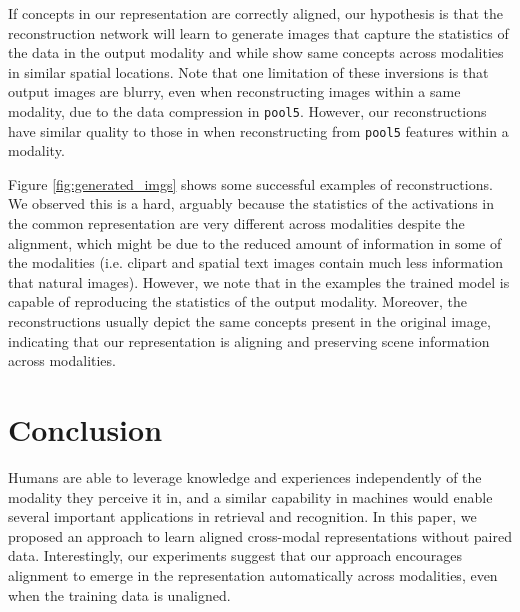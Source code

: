 \documentclass[10pt,journal,compsoc]{IEEEtran}
\begin{document}
    If concepts in our representation are correctly aligned, our hypothesis is that the reconstruction network will learn to generate images that capture the statistics of the data in the output modality and while show same concepts across modalities in similar spatial locations. Note that one limitation of these inversions is that output images are blurry, even when reconstructing images within a same modality, due to the data compression in \texttt{pool5}. However, our reconstructions have similar quality to those in \cite{dosovitskiy2015inverting} when reconstructing from \texttt{pool5} features within a modality.
	
    
    Figure \ref{fig:generated_imgs} shows some successful examples of reconstructions. We observed this is a hard, arguably because the statistics of the activations in the common representation are very different across modalities despite the alignment, which might be due to the reduced amount of information in some of the modalities (i.e. clipart and spatial text images contain much less information that natural images). However, we note that in the examples the trained model is capable of reproducing the statistics of the output modality. Moreover, the reconstructions usually depict the same concepts present in the original image, indicating that our representation is aligning and preserving scene information across modalities.
	

	
\section{Conclusion}

Humans are able to leverage knowledge and experiences independently of the modality they perceive it in, and a similar capability in machines would enable several important applications in retrieval and recognition. In this paper, we proposed an approach to learn aligned cross-modal representations without paired data. Interestingly, our experiments suggest that our approach encourages alignment to emerge in the representation automatically across modalities, even when the training data is unaligned. 
\end{document}
